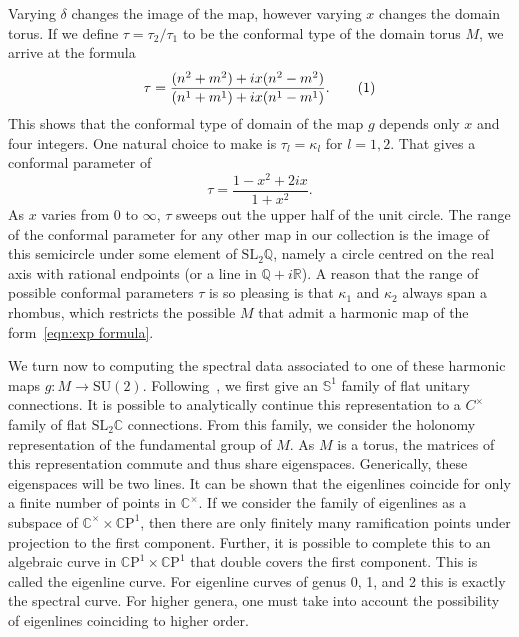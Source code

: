 \documentclass{article}
\numberwithin{equation}{section}
\numberwithin{figure}{section}
\newcommand{\labelthis}[1]{\addtocounter{equation}{1}\tag{\theequation}\label{#1}}
\newcommand{\iu}{i}
\newcommand{\Q}{\mathbb{Q}}
\newcommand{\R}{\mathbb{R}}
\newcommand{\C}{\mathbb{C}}
\newcommand{\CP}{\mathbb{C}\text{P}}
\renewcommand{\S}{\mathbb{S}}
\newcommand{\SU}{\mathrm{SU}}
\newcommand{\SL}{\mathrm{SL}}
\begin{document}
Varying $\delta$ changes the image of the map, however varying $x$ changes the domain torus. If we define $\tau = \tau_2/\tau_1$ to be the conformal type of the domain torus $M$, we arrive at the formula
\[
\tau
= \frac{(n^2 + m^2) + \iu x(n^2 - m^2)}
{(n^1+m^1) +\iu x(n^1-m^1)}.
\labelthis{eqn:conformal type}
\]
This shows that the conformal type of domain of the map $g$ depends only $x$ and four integers. One natural choice to make is $\tau_l=\kappa_l$ for $l=1,2$. That gives a conformal parameter of 
\[
\tau = \frac{1-x^2 + 2\iu x}{1+x^2}.
\]
As $x$ varies from $0$ to $\infty$, $\tau$ sweeps out the upper half of the unit circle. The range of the conformal parameter for any other map in our collection is the image of this semicircle under some element of $\SL_2\Q$, namely a circle centred on the real axis with rational endpoints (or a line in $\Q+\iu\R$).
A reason that the range of possible conformal parameters $\tau$ is so pleasing is that $\kappa_1$ and $\kappa_2$ always span a rhombus, which restricts the possible $M$ that admit a harmonic map of the form~\eqref{eqn:exp formula}.





We turn now to computing the spectral data associated to one of these harmonic maps $g: M \to \SU(2)$. Following~\cite{Hitchin1990}, we first give an $\S^1$ family of flat unitary connections. It is possible to analytically continue this representation to a $C^\times$ family of flat $\SL_2\C$ connections. From this family, we consider the holonomy representation of the fundamental group of $M$. As $M$ is a torus, the matrices of this representation commute and thus share eigenspaces. Generically, these eigenspaces will be two lines. It can be shown that the eigenlines coincide for only a finite number of points in $\C^\times$. If we consider the family of eigenlines as a subspace of $\C^\times \times \CP^1$, then there are only finitely many ramification points under projection to the first component. Further, it is possible to complete this to an algebraic curve in $\CP^1 \times \CP^1$ that double covers the first component. This is called the eigenline curve. For eigenline curves of genus 0, 1, and 2 this is exactly the spectral curve. For higher genera, one must take into account the possibility of eigenlines coinciding to higher order.
\end{document}
